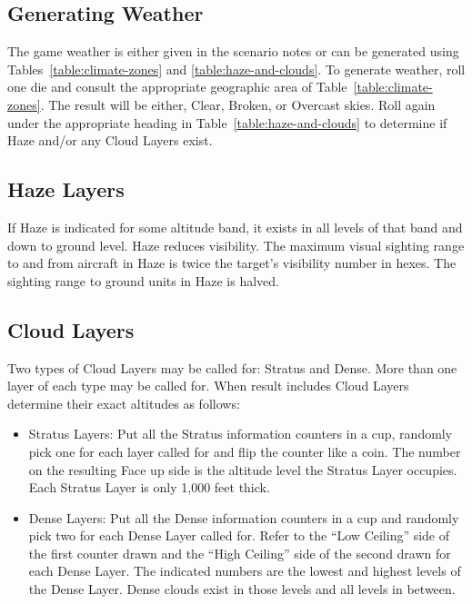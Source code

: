 \begin{advancedrules}
{        \subsection{Generating Weather} The game weather is either given in the scenario notes or can be generated using Tables~\ref{table:climate-zones} and \ref{table:haze-and-clouds}. To generate weather, roll one die and consult the appropriate geographic area of Table~\ref{table:climate-zones}. The result will be either, Clear, Broken, or Overcast skies. Roll again under the appropriate heading in Table~\ref{table:haze-and-clouds} to determine if Haze and/or any Cloud Layers exist.
    }

    \subsection{Haze Layers} If Haze is indicated for some altitude band, it exists in all levels of that band and down to ground level. Haze reduces visibility. The maximum visual sighting range to and from aircraft in Haze is twice the target's visibility number in hexes. The sighting range to ground units in Haze is halved.

    \subsection{Cloud Layers} Two types of Cloud Layers may be called for: Stratus and Dense. More than one layer of each type may be called for. When  result includes Cloud Layers determine their exact altitudes as follows:

    \begin{itemize}
        \item Stratus Layers: Put all the Stratus information counters in a cup, randomly pick one for each layer called for and flip the counter like a coin. The number on the resulting Face up side is the altitude level the Stratus Layer occupies. Each Stratus Layer is only 1,000 feet thick.

        \item Dense Layers: Put all the Dense information counters in a cup and randomly pick two for each Dense Layer called for. Refer to the “Low Ceiling” side of the first counter drawn and the “High Ceiling” side of the second drawn for each Dense Layer. The indicated numbers are the lowest and highest levels of the Dense Layer. Dense clouds exist in those levels and all levels in between.   
    \end{itemize}


\end{advancedrules}
